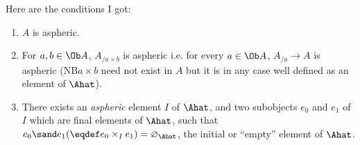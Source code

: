 Here are the conditions I got: %
\begin{enumerate}[label=(T~\arabic*)]
\item\label{it:31.T1}
  $A$ is aspheric.
\item\label{it:31.T2}
  For $a,b\in\Ob A$, $A_{/{a\times b}}$ is aspheric i.e. for every $a \in\Ob A$, $A_{/a} \to A$ is aspheric (NB\enspace $a\times
  b$ need not exist in $A$ but it is in any case well defined as an
  element of $\Ahat$).
\item\label{it:31.T3}
  There exists an \emph{aspheric} element $I$ of $\Ahat$, and
  two subobjects $e_0$ and $e_1$ of $I$ which are final elements of
  $\Ahat$, such that $e_0 \sand e_1 (\eqdef e_0 \times_I e_1) =
  \varnothing_{\Ahat}$, the initial or ``empty'' element of
  $\Ahat$.
\end{enumerate}

